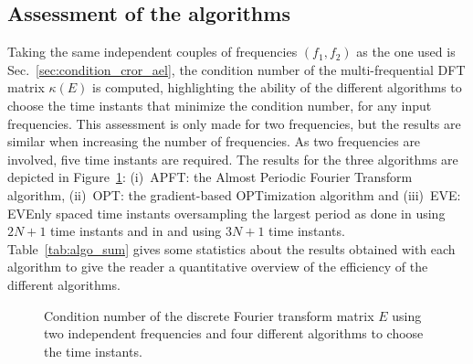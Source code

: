 \subsection{Assessment of the algorithms}
Taking the same independent couples of frequencies $(f_1, f_2)$ as the one
used is Sec.~\ref{sec:condition_cror_ael}, the condition number of the
multi-frequential DFT matrix $\kappa (E)$ is computed, highlighting
the ability of the different algorithms to choose the time instants that
minimize the condition number, for any input frequencies. This
assessment is only made for two frequencies, but the results are similar
when increasing the number of frequencies. As two frequencies are
involved, five time instants are required. The results for the three
algorithms are depicted in Figure~\ref{fig:bench_algo}: (i)~APFT: the
Almost Periodic Fourier Transform algorithm, (ii)~OPT: the
gradient-based OPTimization algorithm and (iii)~EVE: EVEnly spaced
time instants oversampling the largest period as done in
\citet{Gopinath2007} using $2N+1$ time
instants and in \citet{Ekici2007} and \citet{Ekici2008} using $3N+1$
time instants.
Table~\ref{tab:algo_sum} gives some statistics about the results obtained
with each algorithm to give the reader a quantitative overview of the
efficiency of the different algorithms.
\begin{figure}[htp]
  \centering 
  \caption{Condition number of the discrete Fourier transform matrix $E$
  using two independent frequencies and four different algorithms
  to choose the time instants.}
  \label{fig:bench_algo}
\end{figure}

